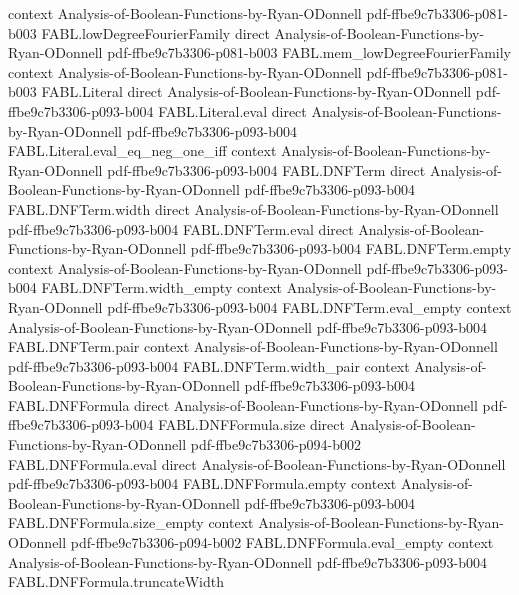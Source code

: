 \begin{theorem}
  {context}
  {Analysis-of-Boolean-Functions-by-Ryan-ODonnell}
  {pdf-ffbe9c7b3306-p081-b003}
\proofstep
  {FABL.lowDegreeFourierFamily}
  {direct}
  {Analysis-of-Boolean-Functions-by-Ryan-ODonnell}
  {pdf-ffbe9c7b3306-p081-b003}
\proofstep
  {FABL.mem_lowDegreeFourierFamily}
  {context}
  {Analysis-of-Boolean-Functions-by-Ryan-ODonnell}
  {pdf-ffbe9c7b3306-p081-b003}
\proofstep
  {FABL.Literal}
  {direct}
  {Analysis-of-Boolean-Functions-by-Ryan-ODonnell}
  {pdf-ffbe9c7b3306-p093-b004}
\proofstep
  {FABL.Literal.eval}
  {direct}
  {Analysis-of-Boolean-Functions-by-Ryan-ODonnell}
  {pdf-ffbe9c7b3306-p093-b004}
\proofstep
  {FABL.Literal.eval_eq_neg_one_iff}
  {context}
  {Analysis-of-Boolean-Functions-by-Ryan-ODonnell}
  {pdf-ffbe9c7b3306-p093-b004}
\proofstep
  {FABL.DNFTerm}
  {direct}
  {Analysis-of-Boolean-Functions-by-Ryan-ODonnell}
  {pdf-ffbe9c7b3306-p093-b004}
\proofstep
  {FABL.DNFTerm.width}
  {direct}
  {Analysis-of-Boolean-Functions-by-Ryan-ODonnell}
  {pdf-ffbe9c7b3306-p093-b004}
\proofstep
  {FABL.DNFTerm.eval}
  {direct}
  {Analysis-of-Boolean-Functions-by-Ryan-ODonnell}
  {pdf-ffbe9c7b3306-p093-b004}
\proofstep
  {FABL.DNFTerm.empty}
  {context}
  {Analysis-of-Boolean-Functions-by-Ryan-ODonnell}
  {pdf-ffbe9c7b3306-p093-b004}
\proofstep
  {FABL.DNFTerm.width_empty}
  {context}
  {Analysis-of-Boolean-Functions-by-Ryan-ODonnell}
  {pdf-ffbe9c7b3306-p093-b004}
\proofstep
  {FABL.DNFTerm.eval_empty}
  {context}
  {Analysis-of-Boolean-Functions-by-Ryan-ODonnell}
  {pdf-ffbe9c7b3306-p093-b004}
\proofstep
  {FABL.DNFTerm.pair}
  {context}
  {Analysis-of-Boolean-Functions-by-Ryan-ODonnell}
  {pdf-ffbe9c7b3306-p093-b004}
\proofstep
  {FABL.DNFTerm.width_pair}
  {context}
  {Analysis-of-Boolean-Functions-by-Ryan-ODonnell}
  {pdf-ffbe9c7b3306-p093-b004}
\proofstep
  {FABL.DNFFormula}
  {direct}
  {Analysis-of-Boolean-Functions-by-Ryan-ODonnell}
  {pdf-ffbe9c7b3306-p093-b004}
\proofstep
  {FABL.DNFFormula.size}
  {direct}
  {Analysis-of-Boolean-Functions-by-Ryan-ODonnell}
  {pdf-ffbe9c7b3306-p094-b002}
\proofstep
  {FABL.DNFFormula.eval}
  {direct}
  {Analysis-of-Boolean-Functions-by-Ryan-ODonnell}
  {pdf-ffbe9c7b3306-p093-b004}
\proofstep
  {FABL.DNFFormula.empty}
  {context}
  {Analysis-of-Boolean-Functions-by-Ryan-ODonnell}
  {pdf-ffbe9c7b3306-p093-b004}
\proofstep
  {FABL.DNFFormula.size_empty}
  {context}
  {Analysis-of-Boolean-Functions-by-Ryan-ODonnell}
  {pdf-ffbe9c7b3306-p094-b002}
\proofstep
  {FABL.DNFFormula.eval_empty}
  {context}
  {Analysis-of-Boolean-Functions-by-Ryan-ODonnell}
  {pdf-ffbe9c7b3306-p093-b004}
\proofstep
  {FABL.DNFFormula.truncateWidth}

\end{theorem}
